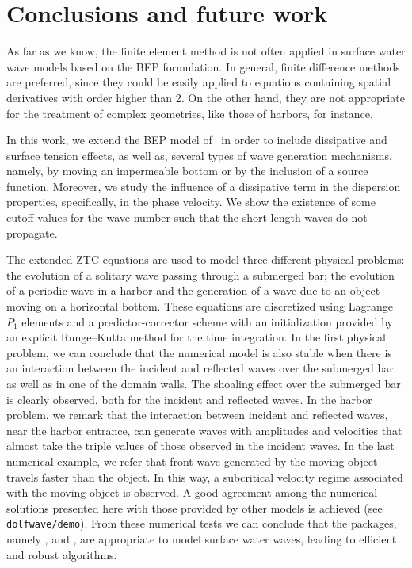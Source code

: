 \section{Conclusions and future work}
As far as we know, the finite element method is not often
applied in surface water wave models based on the BEP
formulation.  In general, finite difference methods are
preferred, since they could be easily applied to equations
containing spatial derivatives with order higher than 2.  On
the other hand, they are not appropriate for the treatment
of complex geometries, like those of harbors, for instance.

In this work, we extend the BEP model
of~\cite{ZhaoTengCheng2004} in order to include dissipative
and surface tension effects, as well as, several types of
wave generation mechanisms, namely, by moving an impermeable
bottom or by the inclusion of a source function.  Moreover,
we study the influence of a dissipative term in the
dispersion properties, specifically, in the phase velocity.
We show the existence of some cutoff values for the wave
number such that the short length waves do not propagate.

The extended ZTC equations are used to model three different
physical problems: the evolution of a solitary wave passing
through a submerged bar; the evolution of a periodic wave in
a harbor and the generation of a wave due to an object
moving on a horizontal bottom.  These equations are
discretized using Lagrange $P_1$ elements and a
predictor-corrector scheme with an initialization provided
by an explicit Runge--Kutta method for the time integration.
In the first physical problem, we can conclude that the
numerical model is also stable when there is an interaction
between the incident and reflected waves over the submerged
bar as well as in one of the domain walls. The shoaling
effect over the submerged bar is clearly observed, both for
the incident and reflected waves.  In the harbor problem, we
remark that the interaction between incident and reflected
waves, near the harbor entrance, can generate waves with
amplitudes and velocities that almost take the triple values
of those observed in the incident waves.  In the last
numerical example, we refer that front wave generated by the
moving object travels faster than the object.  In this way,
a subcritical velocity regime associated with the moving
object is observed.  A good agreement among the numerical
solutions presented here with those provided by other models
is achieved (see {\tt dolfwave/demo}).  From these numerical
tests we can conclude that the \fenics packages,
namely \dolfin, \ufl and \ffc, are appropriate to model
surface water waves, leading to efficient and robust
algorithms.

